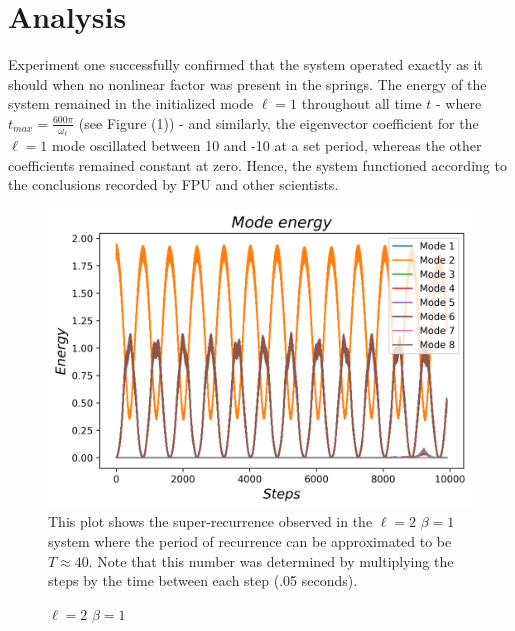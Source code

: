 \documentclass[twocolumn]{article}
\begin{document}
\section{Analysis}
\hspace{\parindent}Experiment one successfully confirmed that the system operated exactly as it should when no nonlinear factor was present in the springs. The energy of the system remained in the initialized mode $\ell=1$ throughout all time $t$ - where $t_{max}=\frac{600\pi}{\omega_\ell}$ (see Figure (1)) - and similarly, the eigenvector coefficient for the $\ell=1$ mode oscillated between 10 and -10 at a set period, whereas the other coefficients remained constant at zero. Hence, the system functioned according to the conclusions recorded by FPU and other scientists.
\begin{figure}[ht!]
\centering
\caption{$\ell=2$ $\beta=1$}
\includegraphics[scale=.53]{EnergiesN=2B=1}
\small{This plot shows the super-recurrence observed in the $\ell=2$ $\beta=1$ system where the period of recurrence can be approximated to be $T\approx40$. Note that this number was determined by multiplying the steps by the time between each step (.05 seconds).}
\end{figure} 
\end{document}

